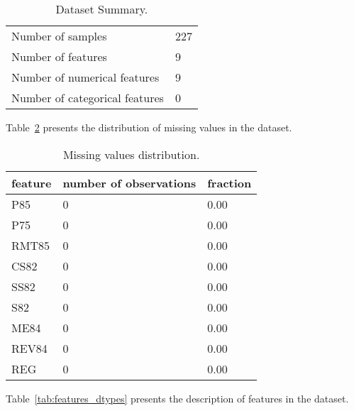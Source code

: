 \documentclass{article}%
\begin{document}
\begin{table}[H]%
\begin{center}%
\renewcommand{\arraystretch}{1.5}%
\begin{tabular}{l l}%
\hline%
Number of samples&227\\%
Number of features&9\\%
Number of numerical features&9\\%
Number of categorical features&0\\%
\hline%
\end{tabular}%
\end{center}%
\caption{Dataset Summary.}%
\label{tab:dataset_summary}%
\end{table}

%
Table~\ref{tab:missing_values} %
presents the distribution of missing values in the dataset.%


\begin{table}[H]%
\begin{center}%
\renewcommand{\arraystretch}{1.5}%
\begin{tabular}{l l l}%
\hline%
\textbf{feature}&\textbf{number of observations}&\textbf{fraction}\\%
\hline%
P85&0&0.00\\%
P75&0&0.00\\%
RMT85&0&0.00\\%
CS82&0&0.00\\%
SS82&0&0.00\\%
S82&0&0.00\\%
ME84&0&0.00\\%
REV84&0&0.00\\%
REG&0&0.00\\%
\hline%
\end{tabular}%
\end{center}%
\caption{Missing values distribution.}%
\label{tab:missing_values}%
\end{table}

%
Table~\ref{tab:features_dtypes} %
presents the description of features in the dataset.%
\end{document}

